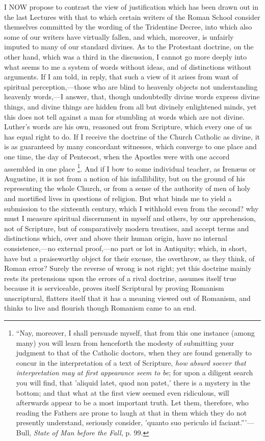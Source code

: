I NOW propose to contrast the view of justification
which has been
drawn out in the last Lectures with that to which certain writers of
the Roman School consider themselves committed by the wording of the
Tridentine Decree, into which also some of our writers have virtually
fallen, and which, moreover, is unfairly imputed to many of our
standard divines. As to the Protestant doctrine, on the other hand,
which was a third in the discussion, I cannot go more deeply into what
seems to me a system of words without ideas, and of distinctions
without arguments. If I am told, in reply, that such a view of it
arises from want of spiritual perception,—those who are blind to
heavenly objects not understanding heavenly words,—I answer, that,
though undoubtedly divine words express divine things, and divine
things are hidden from all but divinely enlightened minds, yet this
does not tell against a man for stumbling at words which are not
divine. Luther's words are his own, reasoned out from Scripture, which
every one of us has equal right to do. If I receive the doctrine of
the Church Catholic as divine, it is as guaranteed by many concordant
witnesses, which converge to one place and one time, the day of
Pentecost, when the Apostles were with one accord assembled in one
place \footnote{``Nay, moreover, I shall persuade myself, that from this one
instance (among many) you will learn from henceforth the modesty of
submitting your judgment to that of the Catholic doctors, when they
are found generally to concur in the interpretation of a text of
Scripture, \emph{how absurd soever that interpretation may at first
appearance seem to be}; for upon a diligent search you will find,
that 'aliquid latet, quod non patet,' there is a mystery in the
bottom; and that what at the first view seemed even ridiculous, will
afterwards appear to be a most important truth. Let them, therefore,
who reading the Fathers are prone to laugh at that in them which they
do not presently understand, seriously consider, 'quanto suo periculo
id faciant.'''—Bull, \emph{State of Man before the Fall}, p. 99.}. And if I bow to
some individual teacher, as Irenæus or Augustine, it is not from a
notion of his infallibility, but on the ground of his representing the
whole Church, or from a sense of the authority of men of holy and
mortified lives in questions of religion. But what binds me to yield a
submission to the sixteenth century, which I withhold even from the
second? why must I measure spiritual discernment in myself and others,
by our apprehension, not of Scripture, but of comparatively modern
treatises, and accept terms and distinctions which, over and above
their human origin, have no internal consistence,—no external proof,—no
part or lot in Antiquity; which, in short, have but a praiseworthy
object for their excuse, the overthrow, as they think, of Roman error?
Surely the reverse of wrong is not right; yet this doctrine mainly
rests its pretensions upon the errors of a rival doctrine, assumes
itself true because it is serviceable, proves itself Scriptural by
proving Romanism unscriptural, flatters itself that it has a meaning
viewed out of Romanism, and thinks to live and flourish though
Romanism came to an end.

